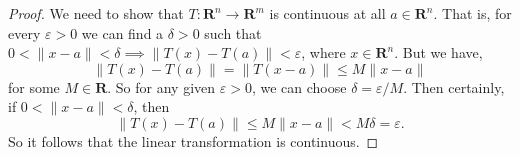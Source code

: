 
\begin{solution}
\begin{proof}
    We need to show that $T:\mathbf{R}^n\to\mathbf{R}^m$
    is continuous at all $a\in \mathbf{R}^n$.
    That is, for every $\varepsilon>0$ we can
    find a $\delta>0$ such that
    $0<\|x-a\|<\delta\implies\|T(x)-T(a)\|<\varepsilon$,
    where $x\in \mathbf{R}^n$. But we have,
    $$\|T(x)-T(a)\| = \|T(x-a)\|\le M\|x-a\|$$
    for some $M\in\mathbf{R}$. So for any given
    $\varepsilon>0$, we can choose
    $\delta=\varepsilon/M$. Then certainly, if
    $0<\|x-a\|<\delta$, then
    $$\|T(x)-T(a)\|\le M\|x-a\|< M\delta=\varepsilon.$$
    So it follows that the linear transformation
    is continuous.
\end{proof}
\end{solution}